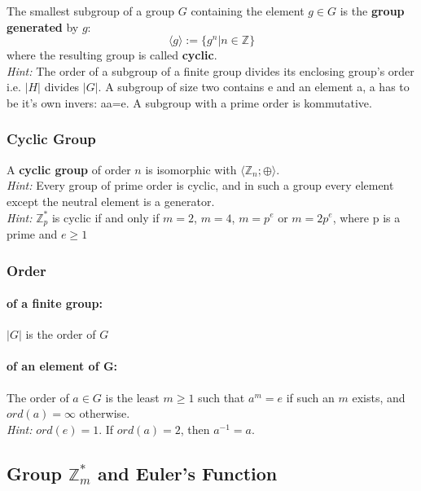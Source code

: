 \documentclass[11pt]{article}
\begin{document}
The smallest subgroup of a group $G$ containing the element $g \in G$ is the \textbf{group generated} by $g$:
\begin{equation*}
	\langle g \rangle := \{g^n | n \in \mathbb{Z} \}
\end{equation*}
where the resulting group is called \textbf{cyclic}.\\

\emph{Hint:} The order of a subgroup of a finite group divides its enclosing group's order i.e. $|H|$ divides $|G|$. A subgroup of size two contains e and an element a, a has to be it's own invers: aa=e. A subgroup with a prime order is kommutative.

\subsubsection{Cyclic Group}

A \textbf{cyclic group} of order $n$ is isomorphic with $\langle \mathbb{Z}_n;\oplus\rangle$. \\

\emph{Hint:} Every group of prime order is cyclic, and in such a group every element except the neutral element is a generator. \\
\emph{Hint:} $\mathbb{Z}_p^*$ is cyclic if and only if $m=2$, $m = 4$, $m = p^e$ or $m = 2p^e$, where p is a prime and $e \geq 1$

\subsubsection{Order}

\paragraph{of a finite group:} $|G|$ is the order of $G$ 
\paragraph{of an element of G:}
The order of $a \in G$ is the least $m \geq 1$ such that $a^m = e$ if such an $m$ exists, and $ord(a) = \infty$ otherwise. \\
\emph{Hint:}  $ord(e) = 1$. If $ord(a) = 2$, then $a^{-1} = a$.

\subsection{Group $\mathbb{Z}_m^*$ and Euler's Function}
\end{document}
